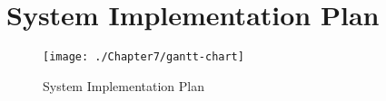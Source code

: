 \chapter{System Implementation Plan}

\begin{figure}[h]
	\texttt{[image: ./Chapter7/gantt-chart]}
		\caption{System Implementation Plan}
\end{figure}


\begin{comment}
\begin{figure}
	\texttt{[image: Flower]}
		\caption{A Flower}
\end{figure}
\end{comment}